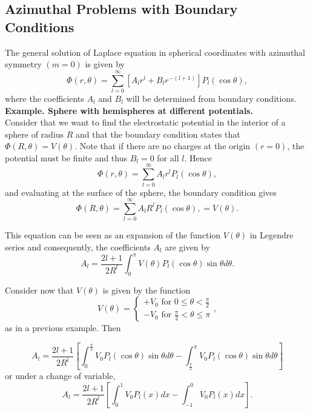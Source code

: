 \subsection{Azimuthal Problems with Boundary Conditions}
The general solution of Laplace equation in spherical coordinates with azimuthal symmetry $(m=0)$ is given by
\begin{equation}
\Phi (r,\theta) = \sum_{l=0}^\infty \left[ A_l r^l + B_l r^{-(l+1)} \right] P_l (\cos \theta),
\end{equation}
where the coefficients $A_l$ and $B_l$ will be determined from boundary conditions.\\
\textbf{Example. Sphere with hemispheres at different potentials.}\\
Consider that we want to find the electrostatic potential in the interior of a sphere of radius $R$ and that the boundary condition states that $\Phi (R,\theta) = V(\theta)$. Note that if there are no charges at the origin $(r=0)$, the potential must be finite and thus $B_l=0$ for all $l$. Hence
\begin{equation}
\Phi (r,\theta) = \sum_{l=0}^\infty  A_l r^l  P_l (\cos \theta),
\end{equation}
and evaluating at the surface of the sphere, the boundary condition gives
\begin{equation}
\Phi (R,\theta) = \sum_{l=0}^\infty  A_l R^l  P_l (\cos \theta),= V(\theta).
\end{equation}

This equation can be seen as an expansion of the function $V(\theta)$ in Legendre series and consequently, the coefficients $A_l$ are given by 
\begin{equation}
A_l = \frac{2l+1}{2R^l} \int_0^\pi V(\theta) P_l (\cos \theta) \sin \theta d\theta.
\end{equation}

Consider now that $V(\theta)$ is given by the function
\begin{equation}
 V(\theta) = 
 \begin{cases}
 +V_0 \text{ for } 0\leq \theta < \frac{\pi}{2}\\
 -V_0 \text{ for } \frac{\pi}{2}< \theta \leq \pi
 \end{cases},
 \end{equation} 
 as in a previous example. Then 

\begin{equation}
A_l = \frac{2l+1}{2R^l} \left[ \int_0^\frac{\pi}{2} V_0 P_l (\cos \theta) \sin \theta d\theta  - \int_\frac{\pi}{2} ^\pi V_0 P_l (\cos \theta) \sin \theta d\theta \right]
\end{equation}
or under a change of variable,
\begin{equation}
A_l = \frac{2l+1}{2R^l} \left[ \int_0^1 V_0 P_l (x)dx  - \int_{-1} ^0 V_0 P_l (x) dx \right].
\end{equation}

